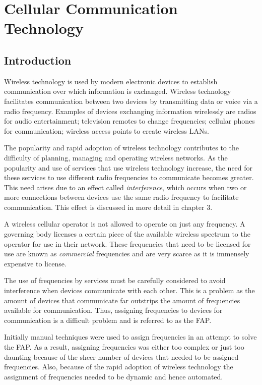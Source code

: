\chapter{Cellular Communication Technology}
\label{chpt:celltech}
\section{Introduction}
 Wireless technology is used by modern electronic devices to establish communication over which information is exchanged\cite{Karen2004}. Wireless technology facilitates communication between two devices by transmitting data or voice via a radio frequency\cite{Karen2004}. Examples of devices exchanging information wirelessly are radios for audio entertainment; television remotes to change frequencies; cellular phones for communication; wireless access points to create wireless LANs\cite{Karen2004}.

The popularity and rapid adoption of wireless technology contributes to the difficulty of planning, managing and operating wireless networks\cite{Karen2004}. As the popularity and use of services that use wireless technology increase, the need for these services to use different radio frequencies to communicate becomes greater\cite{wirelesstelcoMullet}. This need arises due to an effect called \emph{interference}, which occurs when two or more connections between devices use the same radio frequency to facilitate communication\cite{wirelesstelcoMullet}. This effect is discussed in more detail in chapter 3.

A wireless cellular operator is not allowed to operate on just any frequency. A governing body licenses a certain piece of the available wireless spectrum to the operator for use in their network\cite{FAPRAMColouring}. These frequencies that need to be licensed for use are known as \emph{commercial} frequencies and are very scarce as it is immensely expensive to license\cite{FAPRAMColouring}. 

The use of frequencies by services must be carefully considered to avoid interference when devices communicate with each other. This is a problem as the amount of devices that communicate far outstrips the amount of frequencies available for communication\cite{wirelesstelcoMullet}. Thus, assigning frequencies to devices for communication is a difficult problem and is referred to as the \gls{FAP}\cite{Karen2004,Eisenblatter}.

Initially manual techniques were used to assign frequencies in an attempt to solve the \gls{FAP}\cite{Karen2004}. As a result, assigning frequencies was either too complex or just too daunting because of the sheer number of devices that needed to be assigned frequencies\cite{Karen2004}. Also, because of the rapid adoption of wireless technology the assignment of frequencies needed to be dynamic and hence automated\cite{Karen2004}.

